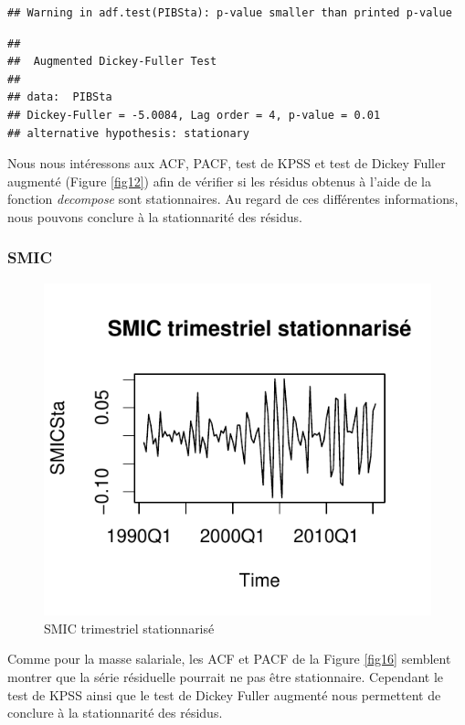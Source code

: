 \documentclass[11pt,]{article}
\begin{document}
\begin{verbatim}
## Warning in adf.test(PIBSta): p-value smaller than printed p-value
\end{verbatim}

\begin{verbatim}
## 
##  Augmented Dickey-Fuller Test
## 
## data:  PIBSta
## Dickey-Fuller = -5.0084, Lag order = 4, p-value = 0.01
## alternative hypothesis: stationary
\end{verbatim}

Nous nous intéressons aux ACF, PACF, test de KPSS et test de Dickey
Fuller augmenté (Figure \ref{fig12}) afin de vérifier si les résidus
obtenus à l'aide de la fonction \emph{decompose} sont stationnaires. Au
regard de ces différentes informations, nous pouvons conclure à la
stationnarité des résidus.

\subsubsection{SMIC}\label{smic-1}

\begin{figure}[htbp]
\centering
\includegraphics{Rapport_final_files/figure-latex/unnamed-chunk-18-1.pdf}
\caption{\label{fig15} SMIC trimestriel stationnarisé}
\end{figure}

Comme pour la masse salariale, les ACF et PACF de la Figure \ref{fig16}
semblent montrer que la série résiduelle pourrait ne pas être
stationnaire. Cependant le test de KPSS ainsi que le test de Dickey
Fuller augmenté nous permettent de conclure à la stationnarité des
résidus.
\end{document}
